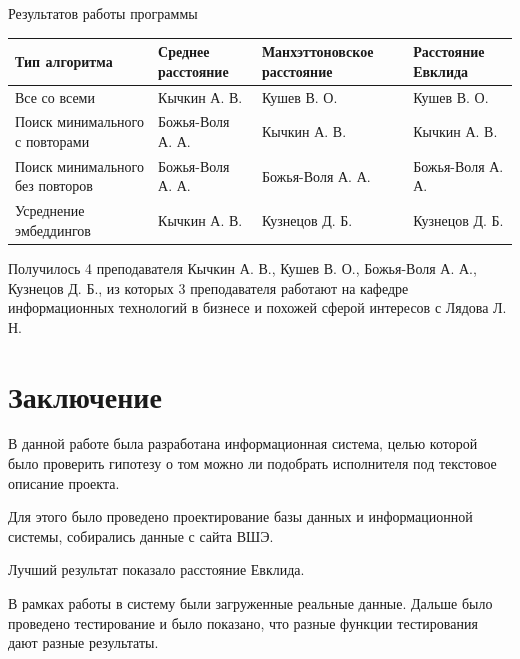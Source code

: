 \documentclass[PI,KR]{HSEUniversity}
\begin{document}
\begin{TABLE}[!h]{Результатов работы программы \label{tbl:tableRes}}
	\begin{tabular}[c]{|p{4cm}|l|p{4cm}|l|}
		\hline
		Тип алгоритма        			& Среднее расстояние & Манхэттоновское расстояние & Расстояние Евклида \\ \hline
		Все со всеми		            & Кычкин А. В.       & Кушев В. О.                & Кушев В. О.        \\ \hline
		Поиск минимального с повторами  & Божья-Воля А. А.   & Кычкин А. В.               & Кычкин А. В.       \\ \hline
		Поиск минимального без повторов & Божья-Воля А. А.   & Божья-Воля А. А.           & Божья-Воля А. А.   \\ \hline
		Усреднение эмбеддингов      	& Кычкин А. В.       & Кузнецов Д. Б.             & Кузнецов Д. Б.     \\ \hline
	\end{tabular}
\end{TABLE}

Получилось 4 преподавателя Кычкин А. В., Кушев В. О., Божья-Воля А. А., Кузнецов Д. Б., из которых 3 преподавателя работают на кафедре информационных технологий в бизнесе и похожей сферой интересов с Лядова Л. Н.
\chapter*{Заключение}
В данной работе была разработана информационная система, целью которой было проверить гипотезу о том можно ли подобрать исполнителя под текстовое описание проекта.

Для этого было проведено проектирование базы данных и информационной системы, собирались данные с сайта ВШЭ.

Лучший результат показало расстояние Евклида.

В рамках работы в систему были загруженные реальные данные. Дальше было проведено тестирование и было показано, что разные функции тестирования дают разные результаты. 

\putbibliography %
\end{document}
